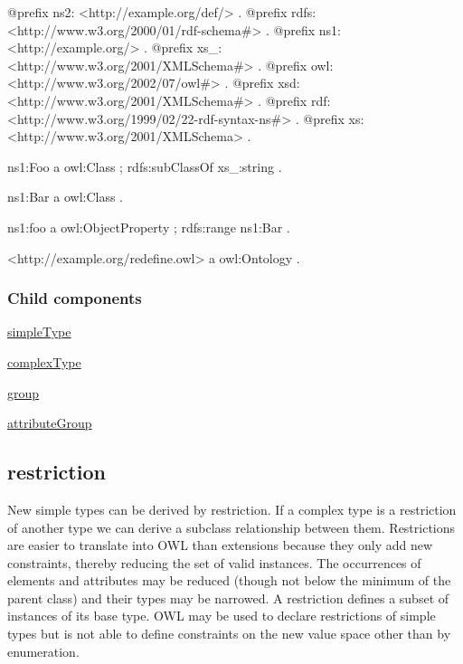 \begin{DoxyCodeInclude}
@prefix ns2:     <http://example.org/def/> .
@prefix rdfs:    <http://www.w3.org/2000/01/rdf-schema#> .
@prefix ns1:     <http://example.org/> .
@prefix xs_:     <http://www.w3.org/2001/XMLSchema#> .
@prefix owl:     <http://www.w3.org/2002/07/owl#> .
@prefix xsd:     <http://www.w3.org/2001/XMLSchema#> .
@prefix rdf:     <http://www.w3.org/1999/02/22-rdf-syntax-ns#> .
@prefix xs:      <http://www.w3.org/2001/XMLSchema> .

ns1:Foo
      a       owl:Class ;
      rdfs:subClassOf xs_:string .

ns1:Bar
      a       owl:Class .

ns1:foo
      a       owl:ObjectProperty ;
      rdfs:range ns1:Bar .

<http://example.org/redefine.owl>
      a       owl:Ontology .
\end{DoxyCodeInclude}
\hypertarget{redefine_redefineChildren}{}\subsubsection{Child components}\label{redefine_redefineChildren}

\begin{DoxyItemize}
\item \hyperlink{simpletype}{simpleType}
\item \hyperlink{complextype}{complexType}
\item \hyperlink{group}{group}
\item \hyperlink{attributegroup}{attributeGroup} 
\end{DoxyItemize}\hypertarget{restriction}{}\subsection{restriction}\label{restriction}
New simple types can be derived by restriction. If a complex type is a restriction of another type we can derive a subclass relationship between them. Restrictions are easier to translate into OWL than extensions because they only add new constraints, thereby reducing the set of valid instances. The occurrences of elements and attributes may be reduced (though not below the minimum of the parent class) and their types may be narrowed. A restriction defines a subset of instances of its base type. OWL may be used to declare restrictions of simple types but is not able to define constraints on the new value space other than by enumeration.



